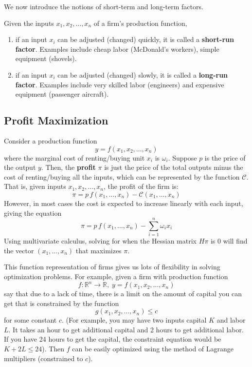 \documentclass{article}
\begin{document}
    We now introduce the notions of short-term and long-term factors. 

    \begin{definition}
      Given the inputs $x_1, x_2, \ldots, x_n$ of a firm's production function, 
      \begin{enumerate}
        \item if an input $x_i$ can be adjusted (changed) quickly, it is called a \textbf{short-run factor}. Examples include cheap labor (McDonald's workers), simple equipment (shovels). 
        \item if an input $x_i$ can be adjusted (changed) slowly, it is called a \textbf{long-run factor}. Examples include very skilled labor (engineers) and expensive equipment (passenger aircraft).
      \end{enumerate}
    \end{definition}

  \subsection{Profit Maximization}

    \begin{definition}[Profit]
      Consider a production function 
      \[y = f(x_1, x_2, \ldots, x_n)\]
      where the marginal cost of renting/buying unit $x_i$ is $\omega_i$. Suppose $p$ is the price of the output $y$. Then, the \textbf{profit} $\pi$ is just the price of the total outputs minus the cost of renting/buying all the inputs, which can be represented by the function $\mathcal{C}$. That is, given inputs $x_1, x_2, \ldots, x_n$, the profit of the firm is:
      \[\pi = p \, f(x_1, \ldots, x_n) - \mathcal{C}(x_1, \ldots, x_n)\]
      However, in most cases the cost is expected to increase linearly with each input, giving the equation
      \[\pi = p \, f(x_1, \ldots, x_n) - \sum_{i=1}^n \omega_i x_i\]
      Using multivariate calculus, solving for when the Hessian matrix $H \pi$ is $0$ will find the vector $(x_1, \ldots, x_n)$ that maximizes $\pi$. 
    \end{definition}

    This function representation of firms gives us lots of flexibility in solving optimization problems. For example, given a firm with production function 
    \[f: \mathbb{R}^n \longrightarrow \mathbb{R}, \; y = f(x_1, x_2, \ldots, x_n)\]
    say that due to a lack of time, there is a limit on the amount of capital you can get that is constrained by the function 
    \[g(x_1, x_2, \ldots, x_n) \leq c\]
    for some constant $c$. (For example, you may have two inputs capital $K$ and labor $L$. It takes an hour to get additional capital and 2 hours to get additional labor. If you have 24 hours to get the capital, the constraint equation would be $K + 2L \leq 24$). Then $f$ can be easily optimized using the method of Lagrange multipliers (constrained to $c$). 
\end{document}
